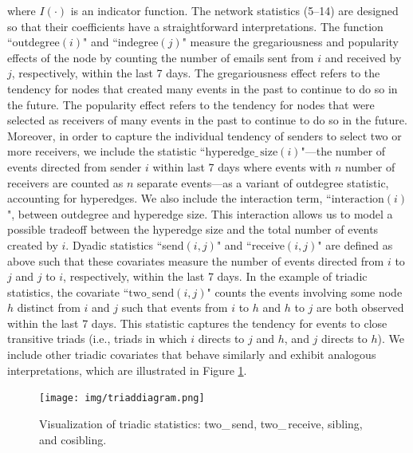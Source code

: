 \documentclass[ba]{imsart}
\numberwithin{equation}{section}
\theoremstyle{plain}
\begin{document}
	where $I(\cdot)$ is an indicator function. The network statistics (5--14) are designed so that their coefficients have a straightforward interpretations. The function ``outdegree$(i)$" and ``indegree$(j)$" measure the gregariousness and popularity effects of the node by counting the number of emails sent from $i$ and received by $j$, respectively, within the last 7 days. The gregariousness effect refers to the tendency for nodes that created many events in the past to continue to do so in the future. The popularity effect refers to the tendency for nodes that were selected as receivers of many events in the past to continue to do so in the future. Moreover, in order to capture the individual tendency of senders to select two or more receivers, we include the statistic ``$\mbox{hyperedge}\_\,\mbox{size}(i)$"---the number of events directed from sender $i$ within last 7 days where events with $n$ number of receivers are counted as $n$ separate events---as a variant of outdegree statistic, accounting for hyperedges. We also include the interaction term, ``$\mbox{interaction}(i)$", between outdegree and hyperedge size. This interaction allows us to model a possible tradeoff between the hyperedge size and the total number of events created by $i$. Dyadic statistics ``send$(i, j)$" and ``receive$(i, j)$" are defined as above such that these covariates measure the number of events directed from $i$ to $j$ and $j$ to $i$, respectively, within the last 7 days. In the example of triadic statistics, the covariate ``$\mbox{two}\_\,\mbox{send}(i, j)$" counts the events involving some node $h$ distinct from $i$ and $j$ such that events from $i$ to $h$ and $h$ to $j$ are both observed within the last 7 days. This statistic captures the tendency for events to close transitive triads (i.e., triads in which $i$ directs to $j$ and $h$, and $j$ directs to $h$). We include other triadic covariates that behave similarly and exhibit analogous interpretations, which are illustrated in Figure \ref{figure:netstats}.
	\begin{figure}[!t]
		\centering
		\texttt{[image: img/triaddiagram.png]}	
		\caption {Visualization of triadic statistics: two\_\,send, two\_\,receive, sibling, and cosibling.}
		\label{figure:netstats}
	\end{figure}
	
\end{document}
